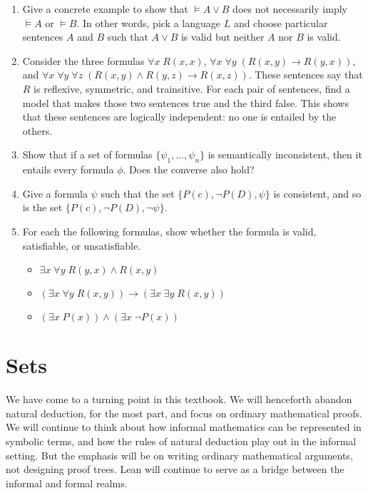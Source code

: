 \documentclass[letterpaper,10pt,english]{sphinxmanual}
\begin{document}
\begin{enumerate}
\item {} 
\sphinxAtStartPar
Give a concrete example to show that \(\vDash A \vee B\) does not necessarily imply \(\vDash A\) or \(\vDash B\). In other words, pick a language \(L\) and choose particular sentences \(A\) and \(B\) such that \(A \vee B\) is valid but neither \(A\) nor \(B\) is valid.

\item {} 
\sphinxAtStartPar
Consider the three formulas \(\forall x \; R(x, x)\), \(\forall x\; \forall y \; (R (x, y) \to R (y, x))\), and \(\forall x \; \forall y \; \forall z \; (R(x, y) \wedge R(y, z) \to R(x, z))\).
These sentences say that \(R\) is reflexive, symmetric, and trainsitive.
For each pair of sentences, find a model that makes those two sentences true and the third false.
This shows that these sentences are logically independent: no one is entailed by the others.

\item {} 
\sphinxAtStartPar
Show that if a set of formulas \(\{\psi_1, \ldots, \psi_n\}\) is semantically inconsistent, then it entails every formula \(\phi\).
Does the converse also hold?

\item {} 
\sphinxAtStartPar
Give a formula \(\psi\) such that the set \(\{P(c), \neg P(D), \psi \}\) is consistent, and so is the set \(\{P(c), \neg P(D), \neg \psi \}\).

\item {} 
\sphinxAtStartPar
For each the following formulas, show whether the formula is valid, satisfiable, or unsatisfiable.
\begin{itemize}
\item {} 
\sphinxAtStartPar
\(\exists x \; \forall y \; R (y, x) \wedge R (x, y)\)

\item {} 
\sphinxAtStartPar
\((\exists x \; \forall y \; R (x, y)) \to (\exists x \; \exists y \; R (x, y))\)

\item {} 
\sphinxAtStartPar
\((\exists x\; P (x)) \wedge (\exists x \; \neg P(x))\)

\end{itemize}

\end{enumerate}


\chapter{Sets}
\label{\detokenize{sets:sets}}\label{\detokenize{sets:id1}}\label{\detokenize{sets::doc}}
\sphinxAtStartPar
We have come to a turning point in this textbook. We will henceforth abandon natural deduction, for the most part, and focus on ordinary mathematical proofs. We will continue to think about how informal mathematics can be represented in symbolic terms, and how the rules of natural deduction play out in the informal setting. But the emphasis will be on writing ordinary mathematical arguments, not designing proof trees. Lean will continue to serve as a bridge between the informal and formal realms.
\end{document}
